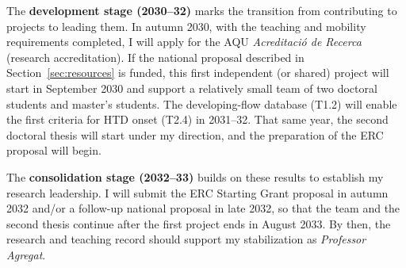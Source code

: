 \documentclass[11pt]{article}
\begin{document}
The \textbf{development stage (2030--32)} marks the transition from contributing to projects to leading them. 
In autumn 2030, with the teaching and mobility requirements completed, I will apply for the AQU \textit{Acreditació de Recerca} (research accreditation). 
If the national proposal described in Section~\ref{sec:resources} is funded, this first independent (or shared) project will start in September 2030 and support a relatively small team of two doctoral students and master's students. 
The developing-flow database (T1.2) will enable the first criteria for HTD onset (T2.4) in 2031--32. That same year, the second doctoral thesis will start under my direction, and the preparation of the ERC proposal will begin.

The \textbf{consolidation stage (2032--33)} builds on these results to establish my research leadership. 
I will submit the ERC Starting Grant proposal in autumn 2032 and/or a follow-up national proposal in late 2032, so that the team and the second thesis continue after the first project ends in August 2033. 
By then, the research and teaching record should support my stabilization as \textit{Professor Agregat}.
\end{document}

